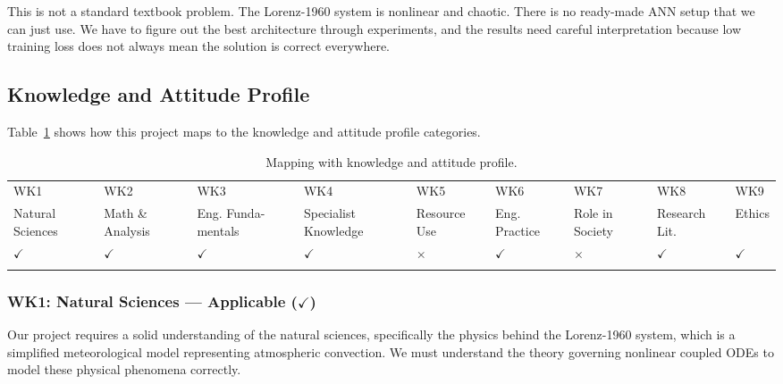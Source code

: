 This is not a standard textbook problem. The Lorenz-1960 system is nonlinear and chaotic. There is no ready-made ANN setup that we can just use. We have to figure out the best architecture through experiments, and the results need careful interpretation because low training loss does not always mean the solution is correct everywhere.

\subsection{Knowledge and Attitude Profile}

Table~\ref{tab:k_profile} shows how this project maps to the knowledge and attitude profile categories.

\begin{center}
    \begin{table}[ht]
        \centering
        \caption{Mapping with knowledge and attitude profile.}
        \begin{tabular}{|p{}|p{}|p{}|p{}|p{}|p{}|p{}|p{}|p{}|}
        \hline
        WK1& WK2& WK3& WK4& WK5& WK6& WK7& WK8& WK9\\
        Natural Sciences & Math \& Analysis & Eng. Funda- mentals & Specialist Knowledge & Resource Use & Eng. Practice & Role in Society & Research Lit. & Ethics\\
        \hline 
        $\checkmark$ & $\checkmark$ & $\checkmark$ & $\checkmark$ & $\times$ & $\checkmark$ & $\times$ & $\checkmark$ & $\checkmark$\\
        &&&&&&&&\\
        \hline 
        \end{tabular}
        \label{tab:k_profile}
    \end{table}
\end{center}

\subsubsection{WK1: Natural Sciences --- Applicable ($\checkmark$)}

Our project requires a solid understanding of the natural sciences, specifically the physics behind the Lorenz-1960 system, which is a simplified meteorological model representing atmospheric convection. We must understand the theory governing nonlinear coupled ODEs to model these physical phenomena correctly.

